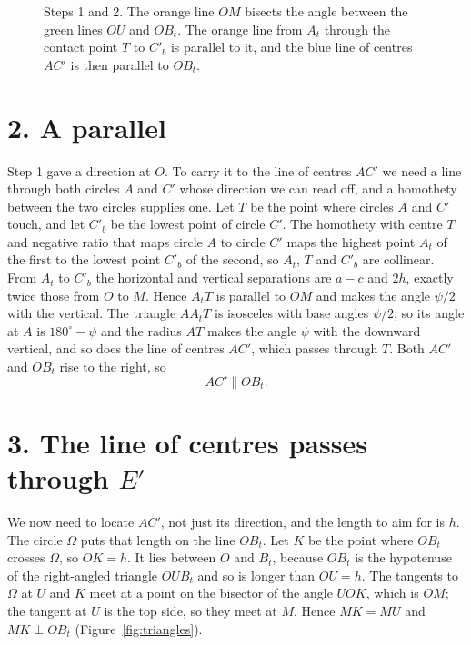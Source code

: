 \documentclass[11pt]{article}
\begin{document}
\begin{figure}[ht]
\centering

\caption{Steps 1 and 2. The orange line $OM$ bisects the angle between the green lines $OU$ and $OB_t$. The orange line from $A_t$ through the contact point $T$ to $C'_b$ is parallel to it, and the blue line of centres $AC'$ is then parallel to $OB_t$.}
\label{fig:bisector}
\end{figure}

\section*{2. A parallel}

Step 1 gave a direction at $O$. To carry it to the line of centres $AC'$ we need a line through both circles $A$ and $C'$ whose direction we can read off, and a homothety between the two circles supplies one. Let $T$ be the point where circles $A$ and $C'$ touch, and let $C'_b$ be the lowest point of circle $C'$. The homothety with centre $T$ and negative ratio that maps circle $A$ to circle $C'$ maps the highest point $A_t$ of the first to the lowest point $C'_b$ of the second, so $A_t$, $T$ and $C'_b$ are collinear. From $A_t$ to $C'_b$ the horizontal and vertical separations are $a-c$ and $2h$, exactly twice those from $O$ to $M$. Hence $A_tT$ is parallel to $OM$ and makes the angle $\psi/2$ with the vertical. The triangle $AA_tT$ is isosceles with base angles $\psi/2$, so its angle at $A$ is $180^\circ-\psi$ and the radius $AT$ makes the angle $\psi$ with the downward vertical, and so does the line of centres $AC'$, which passes through $T$. Both $AC'$ and $OB_t$ rise to the right, so
\[
AC'\parallel OB_t .
\]

\section*{3. The line of centres passes through $E'$}

We now need to locate $AC'$, not just its direction, and the length to aim for is $h$. The circle $\Omega$ puts that length on the line $OB_t$. Let $K$ be the point where $OB_t$ crosses $\Omega$, so $OK=h$. It lies between $O$ and $B_t$, because $OB_t$ is the hypotenuse of the right-angled triangle $OUB_t$ and so is longer than $OU=h$. The tangents to $\Omega$ at $U$ and $K$ meet at a point on the bisector of the angle $UOK$, which is $OM$; the tangent at $U$ is the top side, so they meet at $M$. Hence $MK=MU$ and $MK\perp OB_t$ (Figure~\ref{fig:triangles}).
\end{document}
